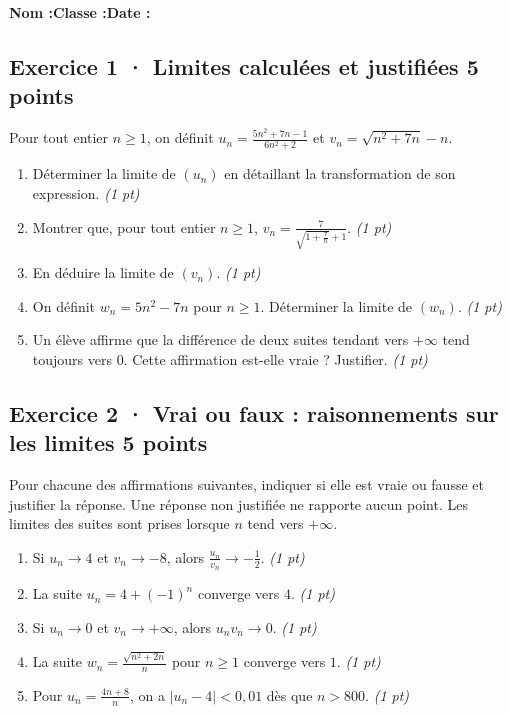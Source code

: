 \smallskip\textbf{Nom :}\enspace\dotfill\quad\textbf{Classe :}\enspace\dotfill\quad\textbf{Date :}\enspace\dotfill

\subsection*{Exercice 1 · Limites calculées et justifiées \hfill 5 points}Pour tout entier $n\ge1$, on définit $u_n=\frac{5n^2+7n-1}{6n^2+2}$ et $v_n=\sqrt{n^2+7n}-n$.

\begin{enumerate}

\item Déterminer la limite de $(u_n)$ en détaillant la transformation de son expression. \hfill\textit{(1 pt)}

\item Montrer que, pour tout entier $n\ge1$, $v_n=\frac{7}{\sqrt{1+\frac{7}n}+1}$. \hfill\textit{(1 pt)}

\item En déduire la limite de $(v_n)$. \hfill\textit{(1 pt)}

\item On définit $w_n=5n^2-7n$ pour $n\ge1$. Déterminer la limite de $(w_n)$. \hfill\textit{(1 pt)}

\item Un élève affirme que la différence de deux suites tendant vers $+\infty$ tend toujours vers $0$. Cette affirmation est-elle vraie ? Justifier. \hfill\textit{(1 pt)}

\end{enumerate}

\subsection*{Exercice 2 · Vrai ou faux : raisonnements sur les limites \hfill 5 points}Pour chacune des affirmations suivantes, indiquer si elle est vraie ou fausse et justifier la réponse. Une réponse non justifiée ne rapporte aucun point. Les limites des suites sont prises lorsque $n$ tend vers $+\infty$.

\begin{enumerate}

\item Si $u_n\to 4$ et $v_n\to-8$, alors $\frac{u_n}{v_n}\to-\frac{1}{2}$. \hfill\textit{(1 pt)}

\item La suite $u_n=4+(-1)^n$ converge vers $4$. \hfill\textit{(1 pt)}

\item Si $u_n\to0$ et $v_n\to+\infty$, alors $u_nv_n\to0$. \hfill\textit{(1 pt)}

\item La suite $w_n=\frac{\sqrt{n^2+2n}}{n}$ pour $n\ge1$ converge vers $1$. \hfill\textit{(1 pt)}

\item Pour $u_n=\frac{4n+8}{n}$, on a $|u_n-4|<0{,}01$ dès que $n> 800$. \hfill\textit{(1 pt)}

\end{enumerate}

